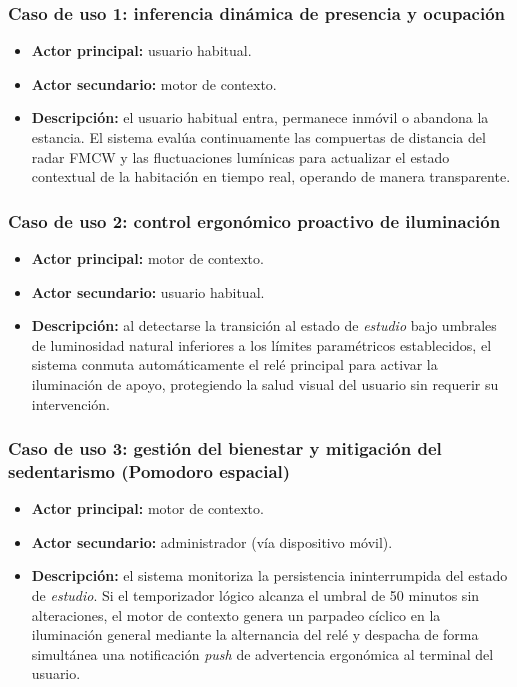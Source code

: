 \subsubsection{Caso de uso 1: inferencia dinámica de presencia y ocupación}
\begin{itemize}
    \item \textbf{Actor principal:} usuario habitual.
    \item \textbf{Actor secundario:} motor de contexto.
    \item \textbf{Descripción:} el usuario habitual entra, permanece inmóvil o abandona la estancia. El sistema evalúa continuamente las compuertas de distancia del radar FMCW y las fluctuaciones lumínicas para actualizar el estado contextual de la habitación en tiempo real, operando de manera transparente.
\end{itemize}

\subsubsection{Caso de uso 2: control ergonómico proactivo de iluminación}
\begin{itemize}
    \item \textbf{Actor principal:} motor de contexto.
    \item \textbf{Actor secundario:} usuario habitual.
    \item \textbf{Descripción:} al detectarse la transición al estado de \textit{estudio} bajo umbrales de luminosidad natural inferiores a los límites paramétricos establecidos, el sistema conmuta automáticamente el relé principal para activar la iluminación de apoyo, protegiendo la salud visual del usuario sin requerir su intervención.
\end{itemize}

\subsubsection{Caso de uso 3: gestión del bienestar y mitigación del sedentarismo (Pomodoro espacial)}
\begin{itemize}
    \item \textbf{Actor principal:} motor de contexto.
    \item \textbf{Actor secundario:} administrador (vía dispositivo móvil).
    \item \textbf{Descripción:} el sistema monitoriza la persistencia ininterrumpida del estado de \textit{estudio}. Si el temporizador lógico alcanza el umbral de 50 minutos sin alteraciones, el motor de contexto genera un parpadeo cíclico en la iluminación general mediante la alternancia del relé y despacha de forma simultánea una notificación \textit{push} de advertencia ergonómica al terminal del usuario.
\end{itemize}

